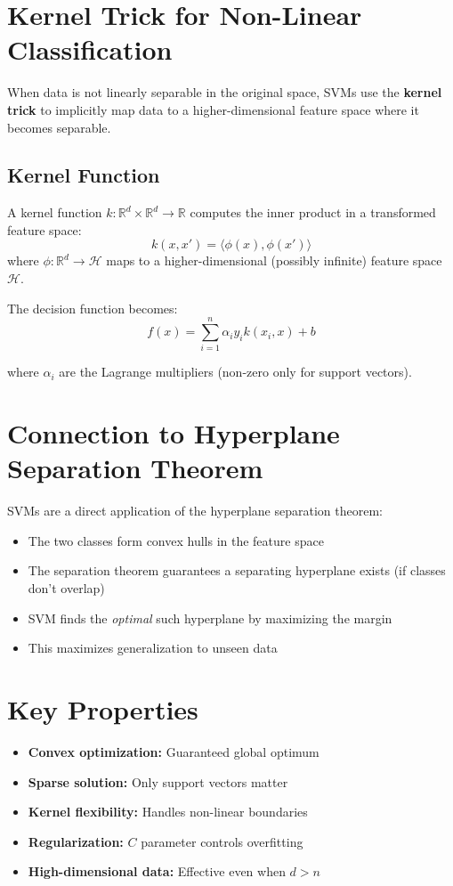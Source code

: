 \documentclass{tufte-handout}
\begin{document}
\section{Kernel Trick for Non-Linear Classification}

When data is not linearly separable in the original space, SVMs use the \textbf{kernel trick} to implicitly map data to a higher-dimensional feature space where it becomes separable.

\subsection{Kernel Function}
A kernel function $k: \mathbb{R}^d \times \mathbb{R}^d \to \mathbb{R}$ computes the inner product in a transformed feature space:
\[
k(x, x') = \langle \phi(x), \phi(x') \rangle
\]
where $\phi: \mathbb{R}^d \to \mathcal{H}$ maps to a higher-dimensional (possibly infinite) feature space $\mathcal{H}$.


The decision function becomes:
\[
f(x) = \sum_{i=1}^{n} \alpha_i y_i k(x_i, x) + b
\]

where $\alpha_i$ are the Lagrange multipliers (non-zero only for support vectors).


\section{Connection to Hyperplane Separation Theorem}

SVMs are a direct application of the hyperplane separation theorem:

\begin{itemize}
    \item The two classes form convex hulls in the feature space
    \item The separation theorem guarantees a separating hyperplane exists (if classes don't overlap)
    \item SVM finds the \emph{optimal} such hyperplane by maximizing the margin
    \item This maximizes generalization to unseen data
\end{itemize}

\section{Key Properties}

\begin{itemize}
    \item \textbf{Convex optimization:} Guaranteed global optimum
    \item \textbf{Sparse solution:} Only support vectors matter
    \item \textbf{Kernel flexibility:} Handles non-linear boundaries
    \item \textbf{Regularization:} $C$ parameter controls overfitting
    \item \textbf{High-dimensional data:} Effective even when $d > n$
\end{itemize}
\end{document}
